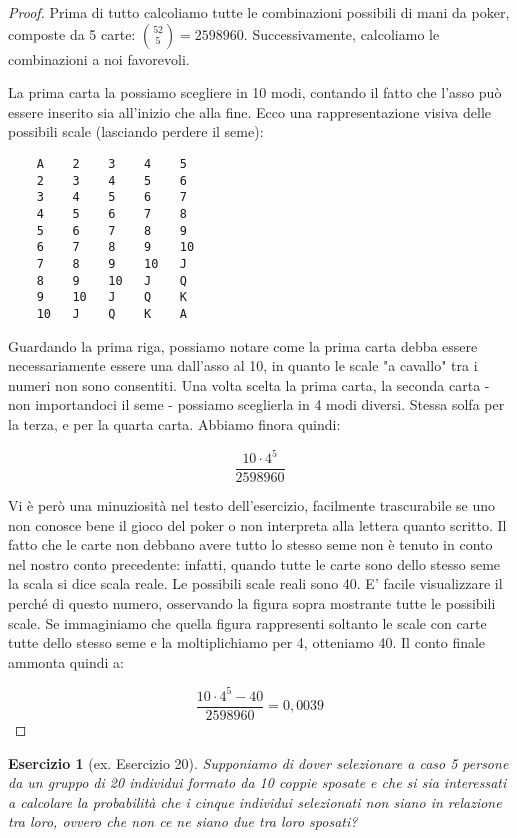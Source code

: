 \documentclass[12pt]{article}
\newtheorem{theorem}{Esercizio}
\begin{document}
\begin{proof}
Prima di tutto calcoliamo tutte le combinazioni possibili di mani da poker, composte da 5 carte: ${52 \choose 5} = 2598960$. Successivamente, calcoliamo le combinazioni a noi favorevoli. 

La prima carta la possiamo scegliere in 10 modi, contando il fatto che l'asso può essere inserito sia all'inizio che alla fine. Ecco una rappresentazione visiva delle possibili scale (lasciando perdere il seme):

\begin{verbatim}
    A    2    3    4    5    
    2    3    4    5    6
    3    4    5    6    7
    4    5    6    7    8
    5    6    7    8    9
    6    7    8    9    10
    7    8    9    10   J
    8    9    10   J    Q
    9    10   J    Q    K
    10   J    Q    K    A
\end{verbatim}

Guardando la prima riga, possiamo notare come la prima carta debba essere necessariamente essere una dall'asso al 10, in quanto le scale "a cavallo" tra i numeri non sono consentiti. Una volta scelta la prima carta, la seconda carta - non importandoci il seme - possiamo sceglierla in 4 modi diversi. Stessa solfa per la terza, e per la quarta carta. Abbiamo finora quindi:

$$\frac{10 \cdot 4^5}{2598960}$$

Vi è però una minuziosità nel testo dell'esercizio, facilmente trascurabile se uno non conosce bene il gioco del poker o non interpreta alla lettera quanto scritto. Il fatto che le carte non debbano avere tutto lo stesso seme non è tenuto in conto nel nostro conto precedente: infatti, quando tutte le carte sono dello stesso seme la scala si dice scala reale. Le possibili scale reali sono 40. E' facile visualizzare il perché di questo numero, osservando la figura sopra mostrante tutte le possibili scale. Se immaginiamo che quella figura rappresenti soltanto le scale con carte tutte dello stesso seme e la moltiplichiamo per 4, otteniamo 40. Il conto finale ammonta quindi a:

$$\frac{10 \cdot 4^5 - 40}{2598960} = 0,0039$$

\end{proof}

\begin{theorem}[ex. Esercizio 20]
Supponiamo di dover selezionare a caso 5 persone da un gruppo di 20 individui formato da 10 coppie sposate e che si sia interessati a calcolare la probabilità che i cinque individui selezionati non siano in relazione tra loro, ovvero che non ce ne siano due tra loro sposati?
\end{theorem}
\end{document}
